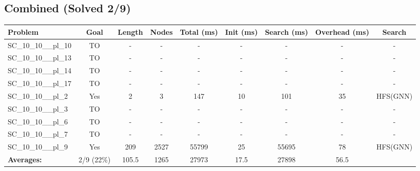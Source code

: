 \documentclass{article}
\begin{document}
\subsection*{Combined (Solved 2/9)}
\begin{tabular}{lcccccccc}
\toprule
Problem & Goal & Length & Nodes & Total (ms) & Init (ms) & Search (ms) & Overhead (ms) & Search \\
\midrule
SC\_10\_10\_\_pl\_10 & TO & - & - & - & - & - & - & - \\
SC\_10\_10\_\_pl\_13 & TO & - & - & - & - & - & - & - \\
SC\_10\_10\_\_pl\_14 & TO & - & - & - & - & - & - & - \\
SC\_10\_10\_\_pl\_17 & TO & - & - & - & - & - & - & - \\
SC\_10\_10\_\_pl\_2 & Yes & 2 & 3 & 147 & 10 & 101 & 35 & HFS(GNN) \\
SC\_10\_10\_\_pl\_3 & TO & - & - & - & - & - & - & - \\
SC\_10\_10\_\_pl\_6 & TO & - & - & - & - & - & - & - \\
SC\_10\_10\_\_pl\_7 & TO & - & - & - & - & - & - & - \\
SC\_10\_10\_\_pl\_9 & Yes & 209 & 2527 & 55799 & 25 & 55695 & 78 & HFS(GNN) \\
\textbf{Averages:} & 2/9 (22\%) & 105.5 & 1265 & 27973 & 17.5 & 27898 & 56.5 & \\
\bottomrule
\end{tabular}
\\[0.7cm]
\end{document}
